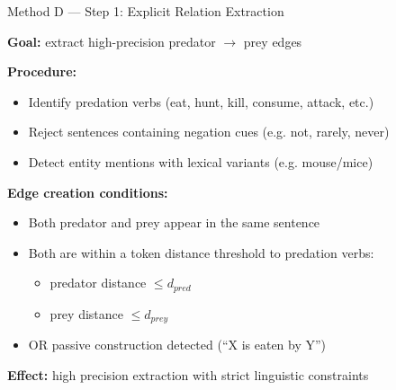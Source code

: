 \documentclass[aspectratio=169,11pt]{beamer}
\begin{document}
\begin{frame}{Method D --- Step 1: Explicit Relation Extraction}

\small

\textbf{Goal:} extract high-precision predator $\rightarrow$ prey edges

\vspace{0.4em}

\textbf{Procedure:}

\begin{itemize}
    \item Identify predation verbs (eat, hunt, kill, consume, attack, etc.)
    \item Reject sentences containing negation cues (e.g. not, rarely, never)
    \item Detect entity mentions with lexical variants (e.g. mouse/mice)
\end{itemize}

\vspace{0.4em}

\textbf{Edge creation conditions:}
\begin{itemize}
    \item Both predator and prey appear in the same sentence
    \item Both are within a token distance threshold to predation verbs:
    \begin{itemize}
        \item predator distance $\leq d_{pred}$
        \item prey distance $\leq d_{prey}$
    \end{itemize}
    \item OR passive construction detected (``X is eaten by Y'')
\end{itemize}

\vspace{0.4em}

\textbf{Effect:} high precision extraction with strict linguistic constraints

\end{frame}
\end{document}
